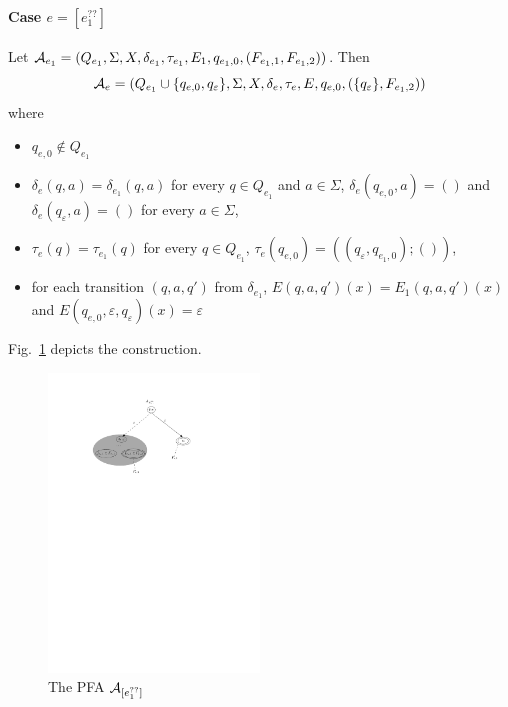 \paragraph{Case $e = [e_1^{??}]$} 
Let $\mathcal{A}_{e_1} = (Q_{e_1},
		\Sigma, X, \delta_{e_1}, \tau_{e_1}, E_1 , q_{e_1,0}, (F_{e_1,1}, F_{e_1,2}))$. 
Then 
\[\mathcal{A}_e = (Q_{e_1} \cup \{q_{e,0}, q_{\varepsilon}\}, \Sigma, X, 
		\delta_e, \tau_e, E, q_{e,0}, (\{q_{\varepsilon}\}, F_{e_1,2}))\] 
where 
		\begin{itemize}
			\item $q_{e,0}  \not \in Q_{e_1}$
			\item $\delta_e(q, a) = \delta_{e_1}(q, a)$ for every $q \in Q_{e_1}$ and $a \in \Sigma$, $\delta_e(q_{e,0}, a)  = ()$ and $\delta_e(q_{\varepsilon}, a) = ()$ for every $a \in \Sigma$, 
			\item $\tau_e(q) = \tau_{e_1}(q)$ for every $q \in Q_{e_1}$, $\tau_e(q_{e,0}) = ((q_{\varepsilon}, q_{e_1,0}); ())$,
			
			\item for each transition $(q, a, q')$ from $\delta_{e_1}$, $E(q,a,q')(x) = E_1(q,a,q')(x)$ and $E(q_{e,0},\varepsilon,q_{\varepsilon})(x) =\varepsilon$
		\end{itemize}
Fig.~\ref{fig-reg2pfa-7} depicts the construction. 
		\begin{figure}[ht]
			\centering
			\includegraphics[width = 0.5\textwidth]{reg2pfa-7.pdf}
			\caption{The PFA $\mathcal{A}_{[e_1^{??}]}$}
			\label{fig-reg2pfa-7}
		\end{figure}
	
